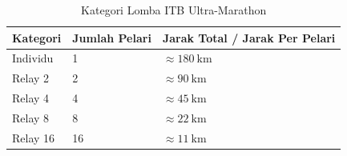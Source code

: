 \begin{table}[h]
\centering
\begin{tabular}{ | p{3cm} | p{3cm} | p{5cm} | }
    \hline
    Kategori & Jumlah Pelari & Jarak Total / Jarak Per Pelari \\
    \hline
    Individu & 1 & $\approx 180~\text{km}$ \\
    Relay 2 & 2 & $\approx 90~\text{km}$ \\
    Relay 4 & 4 & $\approx 45~\text{km}$ \\
    Relay 8 & 8 & $\approx 22~\text{km}$ \\
    Relay 16 & 16 & $\approx 11~\text{km}$ \\
    \hline
\end{tabular}
\caption{Kategori Lomba ITB Ultra-Marathon}
\label{tab:kategori}
\end{table}
